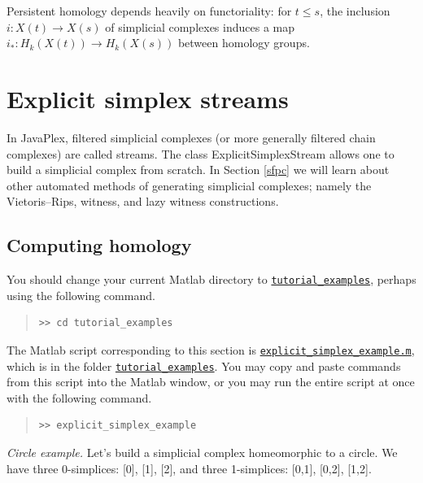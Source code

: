 \documentclass[amscd, amssymb, verbatim]{amsart}[12pt]
\theoremstyle{remark}
\theoremstyle{remark}
\theoremstyle{remark}
\begin{document}
Persistent homology depends heavily on functoriality: for $t\leq s$, the inclusion $i:X(t)\to X(s)$ of simplicial complexes induces a map $i_*:H_k(X(t))\to H_k(X(s))$ between homology groups. 




\section{Explicit simplex streams}\label{explicitStream}

In JavaPlex, filtered simplicial complexes (or more generally filtered chain complexes) are called streams. The class ExplicitSimplexStream allows one to build a simplicial complex from scratch. In Section \ref{sfpc} we will learn about other automated methods of generating simplicial complexes; namely the Vietoris--Rips, witness, and lazy witness constructions. 


\subsection{Computing homology}

You should change your current Matlab directory to \href{https://github.com/appliedtopology/javaplex/tree/master/src/matlab/for_distribution/tutorial_examples}{\texttt{tutorial\_examples}}, perhaps using the following command.

\begin{quote} \begin{verbatim} 
>> cd tutorial_examples
\end{verbatim} \end{quote}

The Matlab script corresponding to this section is \href{https://github.com/appliedtopology/javaplex/tree/master/src/matlab/for_distribution/tutorial_examples/explicit_simplex_example.m}{\texttt{explicit\_simplex\_example.m}}, which is in the folder \href{https://github.com/appliedtopology/javaplex/tree/master/src/matlab/for_distribution/tutorial_examples}{\texttt{tutorial\_examples}}. You may copy and paste commands from this script into the Matlab window, or you may run the entire script at once with the following command.

\begin{quote} \begin{verbatim} 
>> explicit_simplex_example
\end{verbatim} \end{quote}

{\em Circle example.} Let's build a simplicial complex homeomorphic to a circle. We have three 0-simplices: [0], [1], [2], and three 1-simplices: [0,1], [0,2], [1,2].
\end{document}
